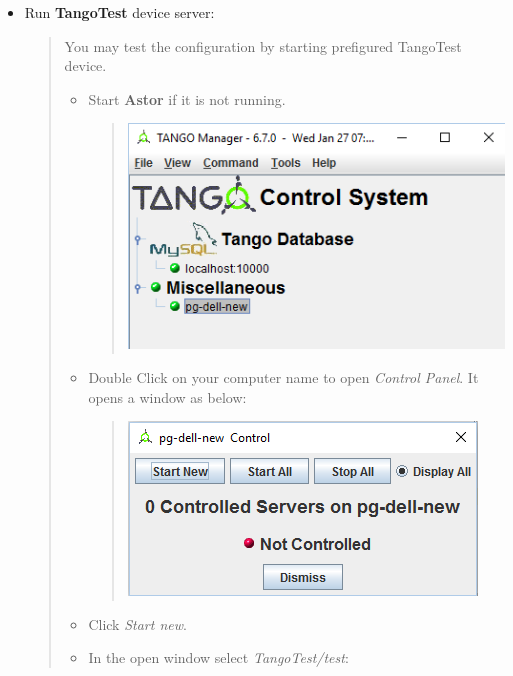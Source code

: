 \documentclass[letterpaper,10pt,english]{sphinxmanual}
\begin{document}
\begin{itemize}
\begin{description}
\end{description}

\item {} 
Run \textbf{TangoTest} device server:
\begin{quote}

You may test the configuration by starting prefigured TangoTest device.
\begin{itemize}
\item {} 
Start \textbf{Astor} if it is not running.
\begin{quote}

\includegraphics{device-server-01.png}
\end{quote}

\item {} 
Double Click on your computer name to open \emph{Control Panel}. It opens a window as below:
\begin{quote}

\includegraphics{device-server-02.png}
\end{quote}

\item {} 
Click \emph{Start new}.

\item {} 
In the open window select \emph{TangoTest/test}:
\begin{quote}


\end{quote}
\end{itemize}
\end{quote}
\end{itemize}
\end{document}
